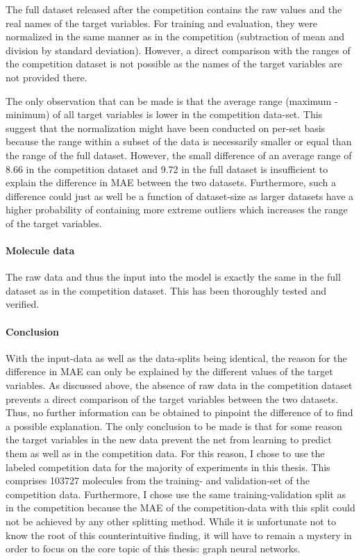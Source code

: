 The full dataset released after the competition contains the raw values and the real names of the target variables. For training and evaluation, they were normalized in the same manner as in the competition (subtraction of mean and division by standard deviation). However, a direct comparison with the ranges of the competition dataset is not possible as the names of the target variables are not provided there. 

The only observation that can be made is that the average range (maximum - minimum) of all target variables is lower in the competition data-set. This suggest that the normalization might have been conducted on per-set basis because the range within a subset of the data is necessarily smaller or equal than the range of the full dataset. However, the small difference of an average range of 8.66 in the competition dataset and 9.72 in the full dataset is insufficient to explain the difference in MAE between the two datasets. Furthermore, such a difference could just as well be a function of dataset-size as larger datasets have a higher probability of containing more extreme outliers which increases the range of the target variables.

\paragraph{Molecule data}

The raw data and thus the input into the model is exactly the same in the full dataset as in the competition dataset. This has been thoroughly tested and verified.

\paragraph{Conclusion}

With the input-data as well as the data-splits being identical, the reason for the difference in MAE can only be explained by the different values of the target variables. As discussed above, the absence of raw data in the competition dataset prevents a direct comparison of the target variables between the two datasets. Thus, no further information can be obtained to pinpoint the difference of to find a possible explanation. The only conclusion to be made is that for some reason the target variables in the new data prevent the net from learning to predict them as well as in the competition data. For this reason, I chose to use the labeled competition data for the majority of experiments in this thesis. This comprises 103727 molecules from the training- and validation-set of the competition data.
Furthermore, I chose use the same training-validation split as in the competition because the MAE of the competition-data with this split could not be achieved by any other splitting method. While it is unfortunate not to know the root of this counterintuitive finding, it will have to remain a mystery in order to focus on the core topic of this thesis: graph neural networks. 


